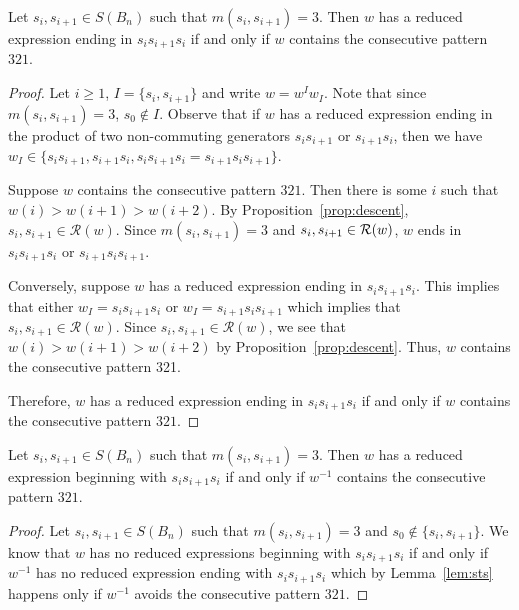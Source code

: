 \begin{lemma}\label{lem:sts}
Let $s_i,s_{i+1} \in S(B_n)$ such that $m(s_i,s_{i+1})=3$. Then $w$ has a reduced expression ending in $s_is_{i+1}s_i$ if and only if $w$ contains the consecutive pattern $321$.
\begin{proof}
	Let $i \geq 1$, $I=\{s_i,s_{i+1}\}$ and write $w=w^Iw_I$. Note that since $m(s_i,s_{i+1})=3$, $s_0 \notin I$. Observe that if $w$ has a reduced expression ending in the product of two non-commuting generators $s_is_{i+1}$ or $s_{i+1}s_i$, then we have $w_I \in \{s_is_{i+1}, s_{i+1}s_i, s_is_{i+1}s_i=s_{i+1}s_is_{i+1}\}$.
	
	Suppose $w$ contains the consecutive pattern $321$. Then there is some $i$ such that $w(i) > w(i+1) > w(i+2)$. By Proposition~\ref{prop:descent}, $s_i,s_{i+1} \in \mathcal{R}(w)$. Since $m(s_i,s_{i+1})=3$ and $s_i, s_{i+1} \in \mathcal{R}(w)$, $w$ ends in $s_is_{i+1}s_{i}$ or $s_{i+1}s_is_{i+1}$.
	
	Conversely, suppose $w$ has a reduced expression ending in $s_is_{i+1}s_i$. This implies that either $w_I=s_is_{i+1}s_i$ or $w_I=s_{i+1}s_is_{i+1}$ which implies that $s_i,s_{i+1} \in \mathcal{R}(w)$. Since $s_i,s_{i+1} \in \mathcal{R}(w)$, we see that $w(i)>w(i+1)>w(i+2)$ by Proposition~\ref{prop:descent}. Thus, $w$ contains the consecutive pattern 321.
	
	Therefore, $w$ has a reduced expression ending in $s_is_{i+1}s_i$ if and only if $w$ contains the consecutive pattern $321$. 
\end{proof}	
\end{lemma}

\begin{corollary}\label{lem:endswithsts}
	Let $s_i,s_{i+1} \in S(B_n)$ such that $m(s_i,s_{i+1})=3$. Then $w$ has a reduced expression beginning with $s_is_{i+1}s_i$ if and only if $w^{-1}$ contains the consecutive pattern $321$.
	\begin{proof}
		Let $s_i,s_{i+1} \in S(B_n)$ such that $m(s_i,s_{i+1})=3$ and $s_0 \notin\{s_i,s_{i+1}\}$. We know that $w$ has no reduced expressions beginning with $s_is_{i+1}s_i$ if and only if $w^{-1}$ has no reduced expression ending with $s_is_{i+1}s_i$ which by Lemma~\ref{lem:sts} happens only if $w^{-1}$ avoids the consecutive pattern $321$.
	\end{proof}
\end{corollary}

